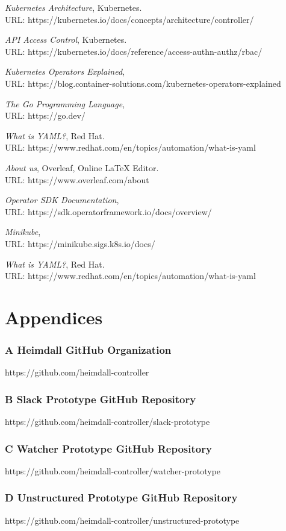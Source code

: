 \documentclass{article}
\begin{document}
\begin{thebibliography}{9}
\emph{Kubernetes Architecture}, Kubernetes. \\URL: https://kubernetes.io/docs/concepts/architecture/controller/ 
  
\emph{API Access Control}, Kubernetes. \\ URL: https://kubernetes.io/docs/reference/access-authn-authz/rbac/  

\emph{Kubernetes Operators Explained}, \\URL: https://blog.container-solutions.com/kubernetes-operators-explained
  
\emph{The Go Programming Language}, \\URL: https://go.dev/

\emph{What is YAML?}, Red Hat. \\URL: https://www.redhat.com/en/topics/automation/what-is-yaml

\emph{About us}, Overleaf, Online LaTeX Editor. \\URL: https://www.overleaf.com/about 

\emph{Operator SDK Documentation},\\ URL: https://sdk.operatorframework.io/docs/overview/

\emph{Minikube}, \\URL: https://minikube.sigs.k8s.io/docs/
  

\emph{What is YAML?}, Red Hat. \\URL: https://www.redhat.com/en/topics/automation/what-is-yaml
  

\end{thebibliography}

\clearpage
\section*{Appendices}
\subsubsection*{A Heimdall GitHub Organization} 
\hypertarget{appendix-a}{https://github.com/heimdall-controller}

\subsubsection*{B Slack Prototype GitHub Repository} 
\hypertarget{appendix-b}{https://github.com/heimdall-controller/slack-prototype}

\subsubsection*{C Watcher Prototype GitHub Repository} 
\hypertarget{appendix-c}{https://github.com/heimdall-controller/watcher-prototype}

\subsubsection*{D Unstructured Prototype GitHub Repository} 
\hypertarget{appendix-d}{https://github.com/heimdall-controller/unstructured-prototype}
\end{document}
